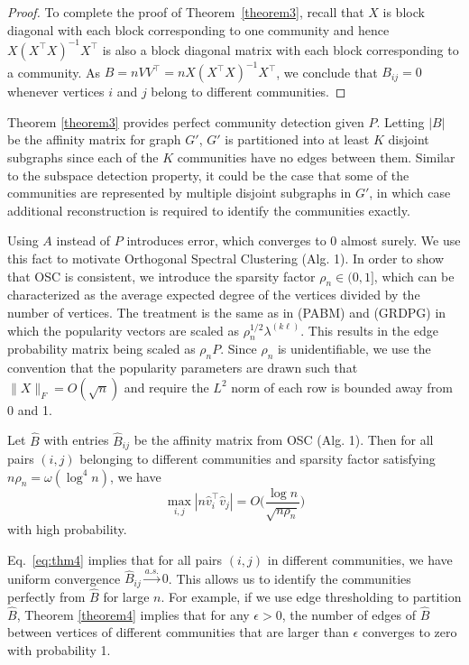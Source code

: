 \documentclass[12pt]{article}
\begin{document}
\begin{proof}
To complete the proof of Theorem~\ref{theorem3}, recall that \(X\) is block diagonal with each block
corresponding to one community and hence \(X (X^\top X)^{-1} X^\top\) is also a
block diagonal matrix with each block corresponding to a community. 
As $B = n VV^{\top} = n X (X^\top X)^{-1} X^\top$, 
we conclude that $B_{ij} = 0$ 
whenever vertices $i$ and $j$ belong to different communities.  
\end{proof}

Theorem \ref{theorem3} provides perfect community detection given \(P\).
Letting \(|B|\) be the affinity matrix for graph \(G'\), \(G'\) is
partitioned into at least \(K\) disjoint subgraphs since each of the
\(K\) communities have no edges between them. Similar to the subspace
detection property, it could be the case that some of the communities
are represented by multiple disjoint subgraphs in \(G'\), in which case
additional reconstruction is required to identify the communities
exactly.

Using \(A\) instead of \(P\) introduces error, which converges to \(0\)
almost surely. We use this fact to motivate Orthogonal Spectral Clustering 
(Alg. 1). 
In order to show that OSC is consistent, 
we introduce the sparsity factor $\rho_n \in (0, 1]$, 
which can be characterized as the average expected degree of the vertices 
divided by the number of vertices. 
The treatment is the same as in \cite{307cbeb9b1be48299388437423d94bf1} (PABM) 
and \cite{rubindelanchy2017statistical} (GRDPG) in which the popularity vectors 
are scaled as $\rho_n^{1/2} \lambda^{(k \ell)}$. 
This results in the edge probability matrix being scaled as $\rho_n P$. 
Since $\rho_n$ is unidentifiable, we use the convention that the popularity parameters are drawn such that $\|X\|_F = O(\sqrt{n})$ and require the $L^2$ norm of each row is bounded away from 0 and 1. 

\begin{theorem}
\label{theorem4}
Let $\hat{B}$ with entries $\hat{B}_{ij}$ be the affinity matrix from OSC
(Alg. 1). Then for all pairs $(i, j)$ belonging to different communities
and sparsity factor satisfying $n \rho_n = \omega(\log^{4}{n})$, we have
\begin{equation} \label{eq:thm4}
\max_{i, j} |n \hat{v}_i^\top \hat{v}_j| =
O\Big( \frac{\log n}{\sqrt{n \rho_n}} \Big)
\end{equation}
with high probability. 
\end{theorem}

Eq.~\eqref{eq:thm4} implies that for all pairs $(i, j)$ in different communities,
we have uniform convergence $\hat{B}_{ij} \stackrel{a.s.}{\to} 0$. 
This allows us to identify the communities perfectly from $\hat{B}$ for large $n$. 
For example, if we use edge thresholding to partition $\hat{B}$, 
Theorem \ref{theorem4} implies that for any $\epsilon > 0$, 
the number of edges of $\hat{B}$ between vertices of different communities 
that are larger than $\epsilon$ converges to zero with probability 1. 
\end{document}
